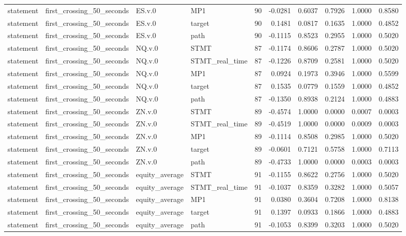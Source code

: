 \begin{tabular}{llllrrrrrr}
statement & first_crossing_50_seconds & ES.v.0 & MP1 & 90 & -0.0281 & 0.6037 & 0.7926 & 1.0000 & 0.8580 \\
statement & first_crossing_50_seconds & ES.v.0 & target & 90 & 0.1481 & 0.0817 & 0.1635 & 1.0000 & 0.4852 \\
statement & first_crossing_50_seconds & ES.v.0 & path & 90 & -0.1115 & 0.8523 & 0.2955 & 1.0000 & 0.5020 \\
statement & first_crossing_50_seconds & NQ.v.0 & STMT & 87 & -0.1174 & 0.8606 & 0.2787 & 1.0000 & 0.5020 \\
statement & first_crossing_50_seconds & NQ.v.0 & STMT_real_time & 87 & -0.1226 & 0.8709 & 0.2581 & 1.0000 & 0.5020 \\
statement & first_crossing_50_seconds & NQ.v.0 & MP1 & 87 & 0.0924 & 0.1973 & 0.3946 & 1.0000 & 0.5599 \\
statement & first_crossing_50_seconds & NQ.v.0 & target & 87 & 0.1535 & 0.0779 & 0.1559 & 1.0000 & 0.4852 \\
statement & first_crossing_50_seconds & NQ.v.0 & path & 87 & -0.1350 & 0.8938 & 0.2124 & 1.0000 & 0.4883 \\
statement & first_crossing_50_seconds & ZN.v.0 & STMT & 89 & -0.4574 & 1.0000 & 0.0000 & 0.0007 & 0.0003 \\
statement & first_crossing_50_seconds & ZN.v.0 & STMT_real_time & 89 & -0.4519 & 1.0000 & 0.0000 & 0.0009 & 0.0003 \\
statement & first_crossing_50_seconds & ZN.v.0 & MP1 & 89 & -0.1114 & 0.8508 & 0.2985 & 1.0000 & 0.5020 \\
statement & first_crossing_50_seconds & ZN.v.0 & target & 89 & -0.0601 & 0.7121 & 0.5758 & 1.0000 & 0.7113 \\
statement & first_crossing_50_seconds & ZN.v.0 & path & 89 & -0.4733 & 1.0000 & 0.0000 & 0.0003 & 0.0003 \\
statement & first_crossing_50_seconds & equity_average & STMT & 91 & -0.1155 & 0.8622 & 0.2756 & 1.0000 & 0.5020 \\
statement & first_crossing_50_seconds & equity_average & STMT_real_time & 91 & -0.1037 & 0.8359 & 0.3282 & 1.0000 & 0.5057 \\
statement & first_crossing_50_seconds & equity_average & MP1 & 91 & 0.0380 & 0.3604 & 0.7208 & 1.0000 & 0.8138 \\
statement & first_crossing_50_seconds & equity_average & target & 91 & 0.1397 & 0.0933 & 0.1866 & 1.0000 & 0.4883 \\
statement & first_crossing_50_seconds & equity_average & path & 91 & -0.1053 & 0.8399 & 0.3203 & 1.0000 & 0.5020 \\

\end{tabular}
